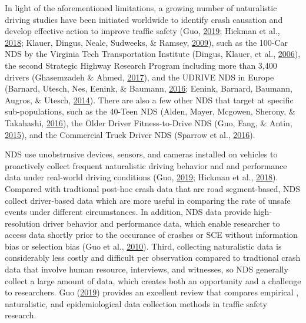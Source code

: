 \documentclass[12pt]{book}
\numberwithin{equation}{chapter}
\begin{document}
In light of the aforementioned limitations, a growing number of naturalistic driving studies have been initiated worldwide to identify crash causation and develop effective action to improve traffic safety (Guo, \protect\hyperlink{ref-guo2019statistical}{2019}; Hickman et al., \protect\hyperlink{ref-hickman2018synthetic}{2018}; Klauer, Dingus, Neale, Sudweeks, \& Ramsey, \protect\hyperlink{ref-klauer2009comparing}{2009}), such as the 100-Car NDS by the Virginia Tech Transportation Institute (Dingus, Klauer, et al., \protect\hyperlink{ref-dingus2006100}{2006}), the second Strategic Highway Research Program including more than 3,400 drivers (Ghasemzadeh \& Ahmed, \protect\hyperlink{ref-ghasemzadeh2017probit}{2017}), and the UDRIVE NDS in Europe (Barnard, Utesch, Nes, Eenink, \& Baumann, \protect\hyperlink{ref-barnard2016study}{2016}; Eenink, Barnard, Baumann, Augros, \& Utesch, \protect\hyperlink{ref-eenink2014udrive}{2014}). There are also a few other NDS that target at specific sub-populations, such as the 40-Teen NDS (Alden, Mayer, Mcgowen, Sherony, \& Takahashi, \protect\hyperlink{ref-alden2016animal}{2016}), the Older Driver Fitness-to-Drive NDS (Guo, Fang, \& Antin, \protect\hyperlink{ref-guo2015older}{2015}), and the Commercial Truck Driver NDS (Sparrow et al., \protect\hyperlink{ref-sparrow2016naturalistic}{2016}).

NDS use unobstrusive devices, sensors, and cameras installed on vehicles to proactively collect frequent naturalistic driving behavior and and performance data under real-world driving conditions (Guo, \protect\hyperlink{ref-guo2019statistical}{2019}; Hickman et al., \protect\hyperlink{ref-hickman2018synthetic}{2018}). Compared with tradtional post-hoc crash data that are road segment-based, NDS collect driver-based data which are more useful in comparing the rate of unsafe events under different circumstances. In addition, NDS data provide high-resolution driver behavior and performance data, which enable researcher to access data shortly prior to the occurance of crashes or SCE without information bias or selection bias (Guo et al., \protect\hyperlink{ref-guo2010near}{2010}). Third, collecting naturalistic data is considerably less costly and difficult per observation compared to tradtional crash data that involve human resource, interviews, and witnesses, so NDS generally collect a large amount of data, which creates both an opportunity and a challenge to researchers. Guo (\protect\hyperlink{ref-guo2019statistical}{2019}) provides an excellent review that compares empirical , naturalistic, and epidemiological data collection methods in traffic safety research.
\end{document}
